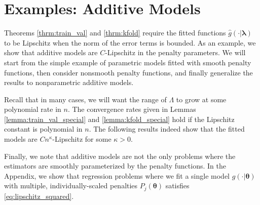 \documentclass[12pt]{article}
\begin{document}
\section{Examples: Additive Models}
\label{sec:examples}

Theorems \ref{thrm:train_val} and \ref{thrm:kfold} require the fitted functions $\hat{g}(\cdot | \boldsymbol{\lambda})$ to be Lipschitz when the norm of the error terms is bounded. As an example, we show that additive models are $C$-Lipschitz in the penalty parameters. We will start from the simple example of parametric models fitted with smooth penalty functions, then consider nonsmooth penalty functions, and finally generalize the results to nonparametric additive models. 

Recall that in many cases, we will want the range of $\Lambda$ to grow at some polynomial rate in $n$. The convergence rates given in Lemmas \ref{lemma:train_val_special} and \ref{lemma:kfold_special} hold if the Lipschitz constant is polynomial in $n$. The following results indeed show that the fitted models are $Cn^\kappa$-Lipschitz for some $\kappa > 0$.


Finally, we note that additive models are not the only problems where the estimators are smoothly parameterized by the penalty functions. In the Appendix, we show that regression problems where we fit a single model $g(\cdot | \boldsymbol{\theta})$ with multiple, individually-scaled penalties $P_j(\boldsymbol{\theta})$ satisfies \eqref{eq:lipschitz_squared}.
\end{document}
